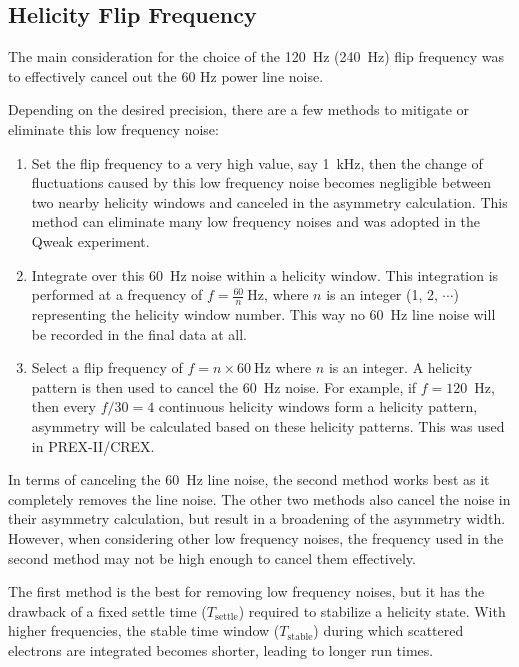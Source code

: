 \subsection{Helicity Flip Frequency}
The main consideration for the choice of the 120~Hz (240~Hz) flip frequency 
was to effectively cancel out the 60 Hz power line noise.

Depending on the desired precision, there are a few methods to mitigate or eliminate this low frequency noise:
\begin{enumerate}
    \item Set the flip frequency to a very high value, say 1~kHz, then
	the change of fluctuations caused by this low frequency noise becomes negligible
	between two nearby helicity windows and canceled in the asymmetry calculation. 
	This method can eliminate many low frequency noises and was adopted in the Qweak experiment.
    \item Integrate over this 60~Hz noise within a helicity window. This integration
	is performed at a frequency of $f = \frac{60}{n}\ \mathrm{Hz}$, where $n$
	is an integer (1, 2, $\cdots$) representing the helicity window number. 
	This way no 60~Hz line noise will be recorded in the final data at all.
    \item Select a flip frequency of $f = n \times 60 \ \mathrm{Hz}$ where $n$
	is an integer. A helicity pattern is then used to cancel the 60~Hz noise. 
	For example, if $f = 120$~Hz, then every $f/30 = 4$ continuous helicity windows form a 
	helicity pattern, asymmetry will be calculated based on these helicity patterns. 
	This was used in PREX-II/CREX.
\end{enumerate}

In terms of canceling the 60~Hz line noise, the second method works best as 
it completely removes the line noise. The other two methods also cancel the noise
in their asymmetry calculation, but result in a broadening of the asymmetry width. 
However, when considering other low frequency noises, the frequency used in 
the second method may not be high enough to cancel them effectively.

The first method is the best for removing low frequency noises, but it has the drawback of a fixed settle time ($T_{\text{settle}}$) required to stabilize a helicity state. With higher frequencies, the stable time window ($T_{\text{stable}}$) during which scattered electrons are integrated becomes shorter, leading to longer run times.

